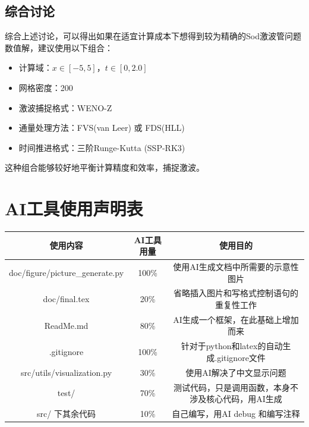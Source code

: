 \documentclass[UTF8]{ctexart}
\begin{document}
\subsection{综合讨论}
综合上述讨论，可以得出如果在适宜计算成本下想得到较为精确的Sod激波管问题数值解，建议使用以下组合：
\begin{itemize}
    \item 计算域：$x \in [-5, 5]$，$t \in [0, 2.0]$
    \item 网格密度：200
    \item 激波捕捉格式：WENO-Z
    \item 通量处理方法：FVS(van Leer) 或 FDS(HLL)
    \item 时间推进格式：三阶Runge-Kutta (SSP-RK3)
\end{itemize}
这种组合能够较好地平衡计算精度和效率，捕捉激波。

\newpage
\appendix
\section{AI工具使用声明表}
\begin{table}[H]
    \centering
    \begin{tabular}{c|c|c}
        \hline
        使用内容 & AI工具用量 & 使用目的 \\ 
        \hline
        doc/figure/picture\_generate.py & 100\% & 使用AI生成文档中所需要的示意性图片 \\
        doc/final.tex & 20\% & 省略插入图片和写格式控制语句的重复性工作 \\ 
        ReadMe.md & 80\% & AI生成一个框架，在此基础上增加而来 \\
        .gitignore & 100\% & 针对于python和latex的自动生成.gitignore文件  \\
        src/utils/visualization.py & 30\% & 使用AI解决了中文显示问题 \\
        test/ & 70\% & 测试代码，只是调用函数，本身不涉及核心代码，用AI生成 \\
        src/ 下其余代码 & 10\% & 自己编写，用AI debug 和编写注释 \\
        \hline
    \end{tabular}
    \label{tab:AI_tools}
\end{table}


\newpage
\section{}
\end{document}

